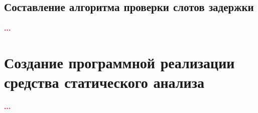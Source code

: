 \documentclass[a4paper,14pt]{extarticle}
\newcommand{\todo}[1]{\textbf{\textcolor{red}{#1}}}
\begin{document}
\subsection{Составление алгоритма проверки слотов задержки}

\todo{...}

\section{Создание программной реализации средства статического анализа}

\todo{...}

\newpage
{}
{}
\printbibliography[title={СПИСОК ИСТОЧНИКОВ}]
\end{document}
